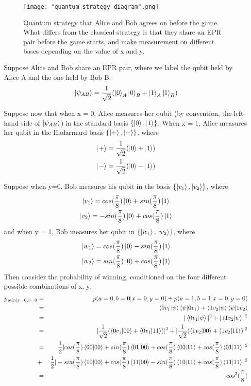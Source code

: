\begin{figure}[h]
    \centering
    \texttt{[image: "quantum strategy diagram".png]}
    \caption{Quantum strategy that Alice and Bob agrees on before the game. What differs from the classical strategy is that they share an EPR pair before the game starts, and make measurement on different bases depending on the value of x and y.}
    \label{fig: quantum strategy diagram}
\end{figure}

Suppose Alice and Bob share an EPR pair, where we label the qubit held by Alice A and the one held by Bob B: 
\begin{equation*}
    \ket{\psi_{AB}}=\frac{1}{\sqrt{2}}(\ket{0}_A \ket{0}_B+\ket{1}_A \ket{1}_B)
\end{equation*}

Suppose now that when x = 0, Alice measures her qubit (by convention, the left-hand side of $\ket{\psi_{AB}}$) in the standard basis $\{\ket{0}, \ket{1}\}$. When x = 1, Alice measures her qubit in the Hadarmard basis $\{\ket{+}, \ket{-}\}$, where
\begin{gather*}
    \ket{+}=\frac{1}{\sqrt{2}}(\ket{0}+\ket{1})\\
    \ket{-}=\frac{1}{\sqrt{2}}(\ket{0}-\ket{1})
\end{gather*}

Suppose when y=0, Bob measures his qubit in the basis $\{\ket{v_1}, \ket{v_2}\}$, where
\begin{gather*}
    \ket{v_1}=cos(\frac{\pi}{8})\ket{0}+sin(\frac{\pi}{8})\ket{1}\\
    \ket{v_2}=-sin(\frac{\pi}{8})\ket{0}+cos(\frac{\pi}{8})\ket{1}  
\end{gather*}
and when y = 1, Bob measures her qubit in $\{\ket{w_1}, \ket{w_2}\}$, where
\begin{gather*}
    \ket{w_1}=cos(\frac{\pi}{8})\ket{0}-sin(\frac{\pi}{8})\ket{1}\\
    \ket{w_2}=sin(\frac{\pi}{8})\ket{0}+cos(\frac{\pi}{8})\ket{1}   
\end{gather*}
Then consider the probability of winning, conditioned on the four different possible combinations of x, y:
\begin{eqnarray*}
p_{win|x=0,y=0}&=&p(a=0, b=0|x=0, y=0)+p(a=1, b=1|x=0, y=0)\\
&=&\braket{0 v_1|\psi}\braket{\psi|0v_1}+\braket{1 v_2|\psi}\braket{\psi|1v_2}\\
&=&|\braket{0 v_1|\psi}|^2 + |\braket{1 v_2|\psi}|^2\\
&=&|\frac{1}{\sqrt{2}}(\braket{0v_1|00}+\braket{0v_1|11})|^2+|\frac{1}{\sqrt{2}}(\braket{1v_2|00}+\braket{1v_2|11})|^2\\
&=&\frac{1}{2}|cos(\frac{\pi}{8})\braket{00|00}+sin(\frac{\pi}{8})\braket{01|00}+cos(\frac{\pi}{8})\braket{00|11}+cos(\frac{\pi}{8})\braket{01|11}|^2\\
&+&\frac{1}{2}|-sin(\frac{\pi}{8})\braket{10|00}+cos(\frac{\pi}{8})\braket{11|00}-sin(\frac{\pi}{8})\braket{10|11}+cos(\frac{\pi}{8})\braket{11|11}|^2\\
&=&cos^2(\frac{\pi}{8})
\end{eqnarray*}


